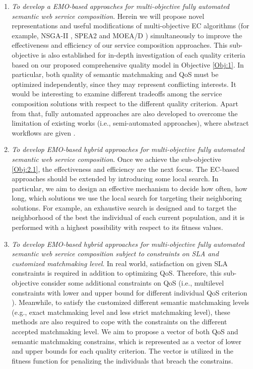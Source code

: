 \begin{enumerate}
\begin{enumerate}
    \item \label{Obj:2.1} \emph{To develop a EMO-based approaches for multi-objective fully automated semantic web service composition}. Herein we will propose novel representations and useful modifications of multi-objective EC algorithms (for example, NSGA-II \cite{deb2002fast}, SPEA2 \cite{zitzler2001spea2} and MOEA/D \cite{zhang2007moea}) simultaneously to improve the effectiveness and efficiency of our service composition approaches. This sub-objective is also established for in-depth investigation of each quality criteria based on our proposed comprehensive quality model in Objective \ref{Obj:1}.  In particular, both quality of semantic matchmaking and QoS must be optimized independently, since they may represent conflicting interests. It would be interesting to examine different tradeoffs among the service composition solutions with respect to the different quality criterion. Apart from that, fully automated approaches are also developed to overcome the limitation of existing works (i.e., semi-automated approaches), where abstract workflows are given .
   
    \item \emph{To develop EMO-based hybrid approaches for multi-objective fully automated semantic web service composition}. Once we achieve the sub-objective \ref{Obj:2.1}, the effectiveness and efficiency are the next focus. The EC-based approaches should be extended by introducing some local search. In particular, we aim to design an effective mechanism to decide how often, how long, which solutions we use the local search for targeting their neighboring solutions. For example, an exhaustive search is designed and to target the neighborhood of the best the individual of each current population, and it is performed with a highest possibility with respect to its fitness values. 

    \item \emph{To develop EMO-based hybrid approaches for multi-objective fully automated semantic web service composition subject to constraints on SLA and customized matchmaking level}. In real world, satisfaction on given SLA constraints is required in addition to optimizing QoS. Therefore, this sub-objective consider some additional constraints on  QoS (i.e., multilevel constraints with lower and upper bound for different individual QoS criterion \cite{yin2014hybrid}). Meanwhile, to satisfy the customized different semantic matchmaking levels (e.g., exact matchmaking level and less strict matchmaking level), these methods are also required to cope with the constraints on the different accepted matchmaking level. We aim to propose a vector of both QoS and semantic matchmaking constrains, which is represented as a vector of lower and upper bounds for each quality criterion. The vector is utilized in the fitness function for penalizing  the individuals that breach the constrains. 
   \end{enumerate}
   

\end{enumerate}
